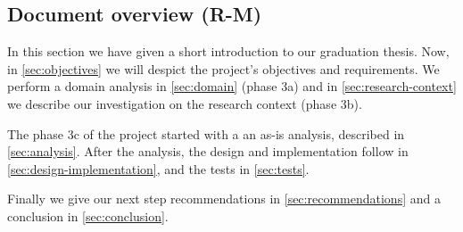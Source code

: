 
\subsection{Document overview (R-M)}
In this section we have given a short introduction to our graduation thesis.
Now, in \autoref{sec:objectives} we will despict the project's objectives and requirements.
We perform a domain analysis in \autoref{sec:domain} (phase 3a) and in \autoref{sec:research-context} we describe our investigation on the research context (phase 3b).

The phase 3c of the project started with a an as-is analysis, described in \autoref{sec:analysis}.
After the analysis, the design and implementation follow in \autoref{sec:design-implementation}, and the tests in \autoref{sec:tests}.

Finally we give our next step recommendations in \autoref{sec:recommendations} and a conclusion in \autoref{sec:conclusion}.
